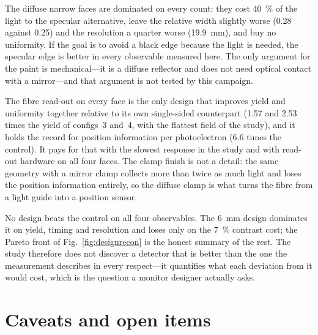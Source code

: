\documentclass[11pt,a4paper]{article}
\begin{document}
The diffuse narrow faces are dominated on every count: they cost
\SI{40}{\percent} of the light to the specular alternative, leave the relative
width slightly worse (\num{0.28} against \num{0.25}) and the resolution a
quarter worse (\SI{19.9}{\milli\meter}), and buy no uniformity. If the goal is
to avoid a black edge because the light is needed, the specular edge is better
in every observable measured here. The only argument for the paint is
mechanical---it is a diffuse reflector and does not need optical contact with a
mirror---and that argument is not tested by this campaign.

The fibre read-out on every face is the only design that improves yield and
uniformity together relative to its own single-sided counterpart
(\num{1.57} and \num{2.53} times the yield of configs~3 and~4, with the
flattest field of the study), and it holds the record for position information
per photoelectron (\num{6.6} times the control). It pays for that with the
slowest response in the study and with read-out hardware on all four faces.
The clamp finish is not a detail: the same geometry with a mirror clamp
collects more than twice as much light and loses the position information
entirely, so the diffuse clamp is what turns the fibre from a light guide into
a position sensor.

No design beats the control on all four observables. The \SI{6}{\milli\meter}
design dominates it on yield, timing and resolution and loses only on the
\SI{7}{\percent} contrast cost; the Pareto front of
Fig.~\ref{fig:designrecon} is the honest summary of the rest. The study
therefore does not discover a detector that is better than the one the
measurement describes in every respect---it quantifies what each deviation from
it would cost, which is the question a monitor designer actually asks.

\section{Caveats and open items}
\label{sec:caveats}
\end{document}
